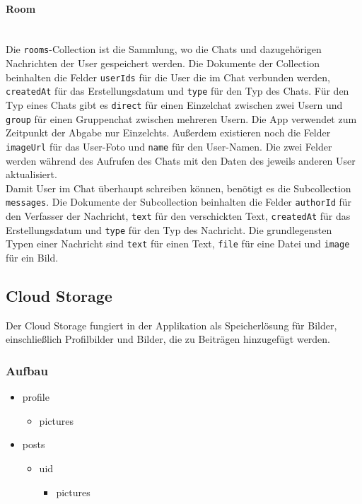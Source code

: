 \paragraph{Room}\mbox{} \\
Die \texttt{rooms}-Collection ist die Sammlung, wo die Chats und dazugehörigen Nachrichten der User gespeichert werden. Die Dokumente der Collection beinhalten die Felder \texttt{userIds} für die User die im Chat verbunden werden, \texttt{createdAt} für das Erstellungsdatum und \texttt{type} für den Typ des Chats. Für den Typ eines Chats gibt es \texttt{direct} für einen Einzelchat zwischen zwei Usern und \texttt{group} für einen Gruppenchat zwischen mehreren Usern. Die App verwendet zum Zeitpunkt der Abgabe nur Einzelchts. Außerdem existieren noch die Felder \texttt{imageUrl} für das User-Foto und \texttt{name} für den User-Namen. Die zwei Felder werden während des Aufrufen des Chats mit den Daten des jeweils anderen User aktualisiert.
\\
Damit User im Chat überhaupt schreiben können, benötigt es die Subcollection \texttt{messages}. Die Dokumente der Subcollection beinhalten die Felder \texttt{authorId} für den Verfasser der Nachricht, \texttt{text} für den verschickten Text, \texttt{createdAt} für das Erstellungsdatum und \texttt{type} für den Typ des Nachricht. Die grundlegensten Typen einer Nachricht sind \texttt{text} für einen Text, \texttt{file} für eine Datei und \texttt{image} für ein Bild.

\subsection{Cloud Storage}
Der Cloud Storage fungiert in der Applikation als Speicherlösung für Bilder, einschließlich Profilbilder und Bilder, die zu Beiträgen hinzugefügt werden.

\subsubsection{Aufbau}
\begin{itemize}
  \item profile
        \begin{itemize}
          \item pictures
        \end{itemize}
  \item posts
        \begin{itemize}
          \item {uid}
                \begin{itemize}
                  \item pictures
                \end{itemize}
        \end{itemize}
\end{itemize}

